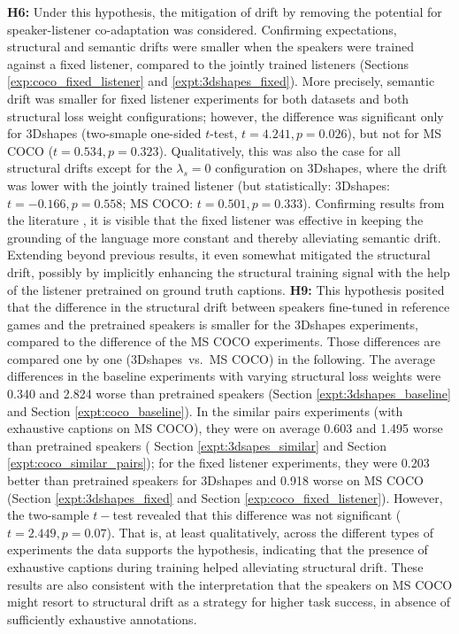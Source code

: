 \textbf{H6:} Under this hypothesis, the mitigation of drift by removing the potential for speaker-listener co-adaptation was considered. Confirming expectations, structural and semantic drifts were smaller when the speakers were trained against a fixed listener, compared to the jointly trained listeners (Sections \ref{exp:coco_fixed_listener} and \ref{expt:3dshapes_fixed}). More precisely, semantic drift was smaller for fixed listener experiments for both datasets and both structural loss weight configurations; however, the difference was significant only for 3Dshapes (two-smaple one-sided $t$-test, $t = 4.241, p = 0.026$), but not for MS COCO ($t = 0.534, p =0.323$). Qualitatively, this was also the case for all structural drifts except for the $\lambda_s = 0$ configuration on 3Dshapes, where the drift was lower with the jointly trained listener (but statistically: 3Dshapes: $t=-0.166, p=0.558$;  MS COCO: $t = 0.501, p =0.333$). Confirming results from the literature \parencite{lazaridou2020multi}, it is visible that the fixed listener was effective in keeping the grounding of the language more constant and thereby alleviating semantic drift. Extending beyond previous results, it even somewhat mitigated the structural drift, possibly by implicitly enhancing the structural training signal with the help of the listener pretrained on ground truth captions.\newline
\textbf{H9:} This hypothesis posited that the difference in the structural drift between speakers fine-tuned in reference games and the pretrained speakers is smaller for the 3Dshapes experiments, compared to the difference of the MS COCO experiments.
Those differences are compared one by one (3Dshapes~vs.~MS COCO) in the following. The average differences in the baseline experiments with varying structural loss weights were 0.340 and 2.824 worse than pretrained speakers (Section \ref{expt:3dshapes_baseline} and Section \ref{expt:coco_baseline}). In the similar pairs experiments (with exhaustive captions on MS COCO), they were on average 0.603 and 1.495 worse than pretrained speakers ( Section \ref{expt:3dsapes_similar} and Section \ref{expt:coco_similar_pairs}); for the fixed listener experiments, they were 0.203 better than pretrained speakers for 3Dshapes and 0.918 worse on MS COCO (Section \ref{expt:3dshapes_fixed} and Section \ref{exp:coco_fixed_listener}). However, the two-sample $t-$test revealed that this difference was not significant ($t=2.449, p=0.07$).
That is, at least qualitatively, across the different types of experiments the data supports the hypothesis, indicating that the presence of exhaustive captions during training helped alleviating structural drift. These results are also consistent with the interpretation that the speakers on MS COCO might resort to structural drift as a strategy for higher task success, in absence of sufficiently exhaustive annotations.
